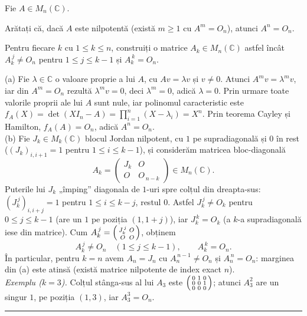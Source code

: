 Fie $A\in M_n(\mathbb{C})$.
\begin{parti}
  \item Arătați că, dacă $A$ este nilpotentă (există $m\ge1$ cu $A^m=O_n$), atunci $A^n=O_n$.
  \item Pentru fiecare $k$ cu $1\le k\le n$, construiți o matrice $A_k\in M_n(\mathbb{C})$ astfel încât $A_k^{\,j}\neq O_n$ pentru $1\le j\le k-1$ și $A_k^{\,k}=O_n$.
\end{parti}
\sol (a) Fie $\lambda\in\mathbb{C}$ o valoare proprie a lui $A$, cu $Av=\lambda v$ și $v\neq0$. Atunci $A^m v=\lambda^m v$, iar din $A^m=O_n$ rezultă $\lambda^m v=0$, deci $\lambda^m=0$, adică $\lambda=0$. Prin urmare toate valorile proprii ale lui $A$ sunt nule, iar polinomul caracteristic este $f_A(X)=\det(XI_n-A)=\prod_{i=1}^{n}(X-\lambda_i)=X^n$. Prin teorema Cayley și Hamilton, $f_A(A)=O_n$, adică $A^n=O_n$.\\[2pt]
(b) Fie $J_k\in M_k(\mathbb{C})$ blocul Jordan nilpotent, cu $1$ pe supradiagonală și $0$ în rest ($(J_k)_{i,i+1}=1$ pentru $1\le i\le k-1$), și considerăm matricea bloc-diagonală
\[ A_k=\begin{pmatrix} J_k & O\\ O & O_{\,n-k}\end{pmatrix}\in M_n(\mathbb{C}). \]
Puterile lui $J_k$ „împing'' diagonala de $1$-uri spre colțul din dreapta-sus: $(J_k^{\,j})_{i,i+j}=1$ pentru $1\le i\le k-j$, restul $0$. Astfel $J_k^{\,j}\neq O_k$ pentru $0\le j\le k-1$ (are un $1$ pe poziția $(1,1+j)$), iar $J_k^{\,k}=O_k$ (a $k$-a supradiagonală iese din matrice). Cum $A_k^{\,j}=\begin{psmallmatrix}J_k^{\,j}&O\\O&O\end{psmallmatrix}$, obținem
\[ A_k^{\,j}\neq O_n\quad(1\le j\le k-1),\qquad A_k^{\,k}=O_n. \]
În particular, pentru $k=n$ avem $A_n=J_n$ cu $A_n^{\,n-1}\neq O_n$ și $A_n^{\,n}=O_n$: marginea din (a) este atinsă (există matrice nilpotente de index exact $n$).\\[2pt]
\emph{Exemplu ($k=3$).} Colțul stânga-sus al lui $A_3$ este $\begin{psmallmatrix}0&1&0\\0&0&1\\0&0&0\end{psmallmatrix}$; atunci $A_3^2$ are un singur $1$, pe poziția $(1,3)$, iar $A_3^3=O_n$.
\vspace{1mm}\hrule

